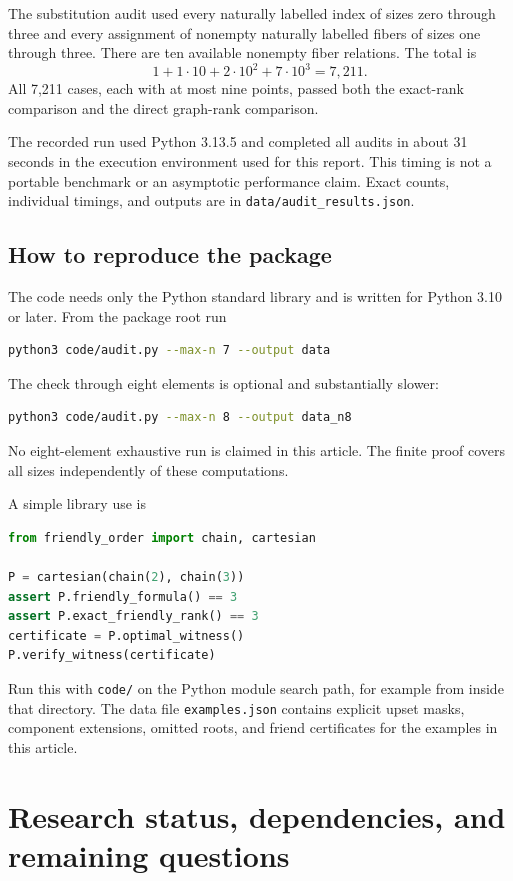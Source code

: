 \documentclass[11pt,a4paper]{article}
\theoremstyle{definition}
\theoremstyle{remark}
\begin{document}
The substitution audit used every naturally labelled index of sizes zero
through three and every assignment of nonempty naturally labelled fibers
of sizes one through three. There are ten available nonempty fiber
relations. The total is
\[
 1+1\cdot10+2\cdot10^2+7\cdot10^3=7{,}211.
\]
All 7,211 cases, each with at most nine points, passed both the exact-rank
comparison and the direct graph-rank comparison.

The recorded run used Python 3.13.5 and completed all audits in about 31
seconds in the execution environment used for this report. This timing is
not a portable benchmark or an asymptotic performance claim. Exact counts,
individual timings, and outputs are in \texttt{data/audit\_results.json}.

\subsection{How to reproduce the package}

The code needs only the Python standard library and is written for Python
3.10 or later. From the package root run
\begin{lstlisting}[language=bash]
python3 code/audit.py --max-n 7 --output data
\end{lstlisting}
The check through eight elements is optional and substantially slower:
\begin{lstlisting}[language=bash]
python3 code/audit.py --max-n 8 --output data_n8
\end{lstlisting}
No eight-element exhaustive run is claimed in this article. The finite
proof covers all sizes independently of these computations.

A simple library use is
\begin{lstlisting}[language=Python]
from friendly_order import chain, cartesian

P = cartesian(chain(2), chain(3))
assert P.friendly_formula() == 3
assert P.exact_friendly_rank() == 3
certificate = P.optimal_witness()
P.verify_witness(certificate)
\end{lstlisting}
Run this with \texttt{code/} on the Python module search path, for example
from inside that directory. The data file \texttt{examples.json} contains
explicit upset masks, component extensions, omitted roots, and friend
certificates for the examples in this article.

\section{Research status, dependencies, and remaining questions}
\end{document}
